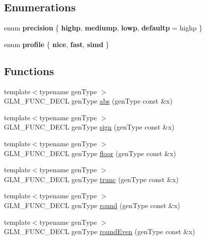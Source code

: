\subsection*{Enumerations}
\begin{DoxyCompactItemize}
\item 
enum {\bfseries precision} \{ {\bfseries highp}, 
{\bfseries mediump}, 
{\bfseries lowp}, 
{\bfseries defaultp} = highp
 \}
\item 
enum {\bfseries profile} \{ {\bfseries nice}, 
{\bfseries fast}, 
{\bfseries simd}
 \}
\end{DoxyCompactItemize}
\subsection*{Functions}
\begin{DoxyCompactItemize}
\item 
{\footnotesize template$<$typename gen\-Type $>$ }\\G\-L\-M\-\_\-\-F\-U\-N\-C\-\_\-\-D\-E\-C\-L gen\-Type \hyperlink{group__core__func__common_gaea946f96ec1df259802effe9f532e1c1}{abs} (gen\-Type const \&x)
\item 
{\footnotesize template$<$typename gen\-Type $>$ }\\G\-L\-M\-\_\-\-F\-U\-N\-C\-\_\-\-D\-E\-C\-L gen\-Type \hyperlink{group__core__func__common_gaa7afd59ab947e313d41cb6d9c655a80c}{sign} (gen\-Type const \&x)
\item 
{\footnotesize template$<$typename gen\-Type $>$ }\\G\-L\-M\-\_\-\-F\-U\-N\-C\-\_\-\-D\-E\-C\-L gen\-Type \hyperlink{group__core__func__common_ga86350252cc9bf86421317460bbd1f21c}{floor} (gen\-Type const \&x)
\item 
{\footnotesize template$<$typename gen\-Type $>$ }\\G\-L\-M\-\_\-\-F\-U\-N\-C\-\_\-\-D\-E\-C\-L gen\-Type \hyperlink{group__core__func__common_gadb091aed51e45872f6dc841affa41c5c}{trunc} (gen\-Type const \&x)
\item 
{\footnotesize template$<$typename gen\-Type $>$ }\\G\-L\-M\-\_\-\-F\-U\-N\-C\-\_\-\-D\-E\-C\-L gen\-Type \hyperlink{group__core__func__common_ga75ebab3fe88a9c5c769135cf5a2649ef}{round} (gen\-Type const \&x)
\item 
{\footnotesize template$<$typename gen\-Type $>$ }\\G\-L\-M\-\_\-\-F\-U\-N\-C\-\_\-\-D\-E\-C\-L gen\-Type \hyperlink{group__core__func__common_ga6535952553479a4bbca7f1f12a011b17}{round\-Even} (gen\-Type const \&x)

\end{DoxyCompactItemize}
